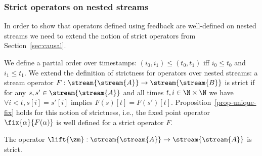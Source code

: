\begin{comment}
And now we apply incrementalize this again, by expanding each
term into 3 other terms and regrouping due to distributivity of $\times$ over addition (bilinearity):

$$
\begin{aligned}
\inc{(\lift{(\inc{(\lift{(a \times b)})})})} = \\
%
\matmult{\mtrx{1 0 0 0}}{\mtrx{0 0 0 1}} +
\matmult{\mtrx{0 0 1 0}}{\mtrx{0 1 0 0}} + \\
\matmult{\mtrx{0 0 1 0}}{\mtrx{0 0 0 1}} + \\
%
\matmult{\mtrx{0 1 0 0}}{\mtrx{0 0 1 0}} +
\matmult{\mtrx{0 0 0 1}}{\mtrx{1 0 0 0}} +\\
\matmult{\mtrx{0 0 0 1}}{\mtrx{0 0 1 0}} +\\
%
\matmult{\mtrx{0 1 0 0}}{\mtrx{0 0 0 1}} +
\matmult{\mtrx{0 0 0 1}}{\mtrx{0 1 0 0}} + \\
\matmult{\mtrx{0 0 0 1}}{\mtrx{0 0 0 1}} = \\
%
\matmult{\mtrx{1 1 1 1}}{\mtrx{0 0 0 1}} +
\matmult{\mtrx{0 0 1 1}}{\mtrx{0 1 0 0}} + \\
\matmult{\mtrx{0 0 0 1}}{\mtrx{1 0 0 0}} +
\matmult{\mtrx{0 1 0 1}}{\mtrx{0 0 1 9}}.
\end{aligned}
$$
\end{comment}

\subsubsection{Strict operators on nested streams}

In order to show that operators defined using feedback are well-defined on
nested streams we need to extend the notion of strict operators from Section~\ref{sec:causal}.

We define a partial order over timestamps: $(i_0, i_1)
\leq (t_0, t_1)$ iff $i_0 \leq t_0$ and $i_1 \leq t_1$.  We extend the
definition of strictness for operators over nested streams: a stream operator
$F: \stream{\stream{A}} \to \stream{\stream{B}}$ is strict if for any $s, s' \in
\stream{\stream{A}}$ and all times $t, i \in \N \times \N$ we have $\forall i <
t, s[i] = s'[i]$ implies $F(s)[t] = F(s')[t]$.
Proposition~\ref{prop-unique-fix} holds for this notion of strictness, i.e., the fixed point operator $\fix{\alpha}{F(\alpha)}$ is well defined for a strict operator $F$.

\begin{proposition}\label{prop-liftz}
The operator $\lift{\zm}: \stream{\stream{A}} \to \stream{\stream{A}}$ is strict.
\end{proposition}

